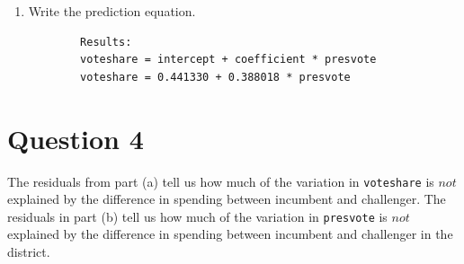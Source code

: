 \documentclass[12pt,letterpaper]{article}
\begin{document}
\begin{enumerate}
		\item Write the prediction equation.
		
		\begin{verbatim} 
		Results: 
		voteshare = intercept + coefficient * presvote
		voteshare = 0.441330 + 0.388018 * presvote
		\end{verbatim}
		
	\end{enumerate}
	

\newpage	
\section*{Question 4}
\noindent The residuals from part (a) tell us how much of the variation in \texttt{voteshare} is $not$ explained by the difference in spending between incumbent and challenger. The residuals in part (b) tell us how much of the variation in \texttt{presvote} is $not$ explained by the difference in spending between incumbent and challenger in the district.
\end{document}
